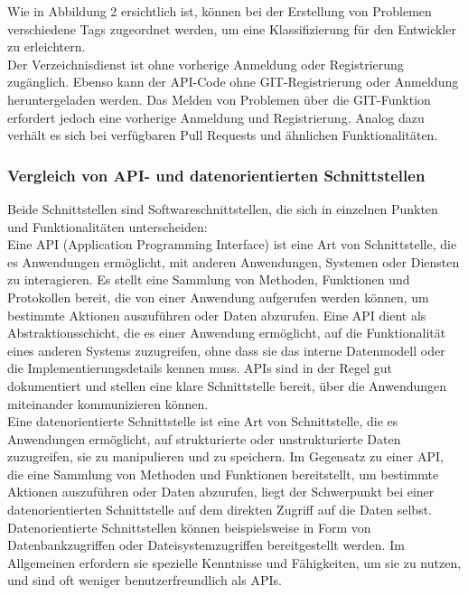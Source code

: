 \documentclass[notitlepage, hidelinks]{article}
\begin{document}
Wie in Abbildung 2 ersichtlich ist, können bei der Erstellung von Problemen verschiedene Tags zugeordnet werden, um eine Klassifizierung für den Entwickler zu erleichtern. \\
Der Verzeichnisdienst ist ohne vorherige Anmeldung oder Registrierung zugänglich. Ebenso kann der API-Code ohne GIT-Registrierung oder Anmeldung heruntergeladen werden. Das Melden von Problemen über die GIT-Funktion erfordert jedoch eine vorherige Anmeldung und Registrierung. Analog dazu verhält es sich bei verfügbaren Pull Requests und ähnlichen Funktionalitäten.

\subsubsection{Vergleich von API- und datenorientierten Schnittstellen}
Beide Schnittstellen sind Softwareschnittstellen, die sich in einzelnen Punkten und Funktionalitäten unterscheiden: \\
Eine API (Application Programming Interface) ist eine Art von Schnittstelle, die es Anwendungen ermöglicht, mit anderen Anwendungen, Systemen oder Diensten zu interagieren. Es stellt eine Sammlung von Methoden, Funktionen und Protokollen bereit, die von einer Anwendung aufgerufen werden können, um bestimmte Aktionen auszuführen oder Daten abzurufen. Eine API dient als Abstraktionsschicht, die es einer Anwendung ermöglicht, auf die Funktionalität eines anderen Systems zuzugreifen, ohne dass sie das interne Datenmodell oder die Implementierungsdetails kennen muss. APIs sind in der Regel gut dokumentiert und stellen eine klare Schnittstelle bereit, über die Anwendungen miteinander kommunizieren können. \\
Eine datenorientierte Schnittstelle ist eine Art von Schnittstelle, die es Anwendungen ermöglicht, auf strukturierte oder unstrukturierte Daten zuzugreifen, sie zu manipulieren und zu speichern. Im Gegensatz zu einer API, die eine Sammlung von Methoden und Funktionen bereitstellt, um bestimmte Aktionen auszuführen oder Daten abzurufen, liegt der Schwerpunkt bei einer datenorientierten Schnittstelle auf dem direkten Zugriff auf die Daten selbst. Datenorientierte Schnittstellen können beispielsweise in Form von Datenbankzugriffen oder Dateisystemzugriffen bereitgestellt werden. Im Allgemeinen erfordern sie spezielle Kenntnisse und Fähigkeiten, um sie zu nutzen, und sind oft weniger benutzerfreundlich als APIs.
\end{document}
